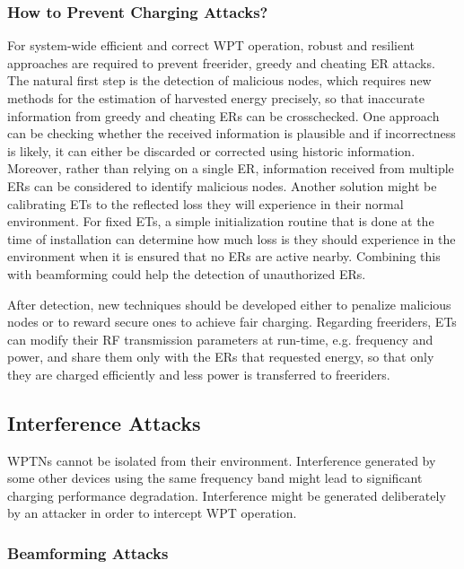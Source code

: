 \documentclass[journal,10pt,draftclsnofoot,onecolumn]{IEEEtran}
\begin{document}
\subsubsection{How to Prevent Charging Attacks?}

For system-wide efficient and correct WPT operation, robust and resilient approaches are required to prevent freerider, greedy and cheating ER attacks. The natural first step is the detection of malicious nodes, which requires new methods for the estimation of harvested energy precisely, so that inaccurate information from greedy and cheating ERs can be crosschecked. One approach can be checking whether the received information is plausible and if incorrectness is likely, it can either be discarded or corrected using historic information. Moreover, rather than relying on a single ER, information received from multiple ERs can be considered to  identify malicious nodes. Another solution might be calibrating ETs to the reflected loss they will experience in their normal environment. For fixed ETs, a simple initialization routine that is done at the time of installation can determine how much loss is they should experience in the environment when it is ensured that no ERs are active nearby.  Combining this with beamforming could help the detection of unauthorized ERs. 

After detection, new techniques should be developed either to penalize malicious nodes or to reward secure ones to achieve fair charging. Regarding freeriders, ETs can modify their RF transmission parameters at run-time, e.g. frequency and power, and share them only with the ERs that requested energy, so that only they are charged efficiently and less power is transferred to freeriders. 

\subsection{Interference Attacks}

WPTNs cannot be isolated from their environment. Interference generated by some other devices using the same frequency band might lead to significant charging performance degradation. Interference might be generated deliberately by an attacker in order to intercept WPT operation. 

\subsubsection{Beamforming Attacks}
\end{document}

